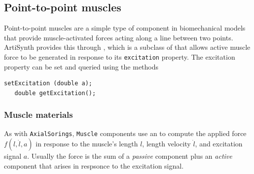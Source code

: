 
%
%


\subsection{Point-to-point muscles}
\label{PointToPointMuscles:sec}

Point-to-point muscles are a simple type of component in biomechanical
models that provide muscle-activated forces acting along a line
between two points. ArtiSynth provides this through
, which is a subclass of
 that allows active
muscle force to be generated in response to its {\tt excitation}
property. The excitation property can be set and queried using the
methods
%
\begin{lstlisting}[]
   setExcitation (double a);
   double getExcitation();
\end{lstlisting}
%

\subsubsection{Muscle materials}

As with {\tt AxialSorings}, {\tt Muscle} components use an
 to compute the
applied force $f (l, \dot l, a)$ in response to the muscle's length
$l$, length velocity $\dot l$, and excitation signal $a$.  Usually the
force is the sum of a {\it passive} component plus an {\it active}
component that arises in respsonce to the excitation signal.

